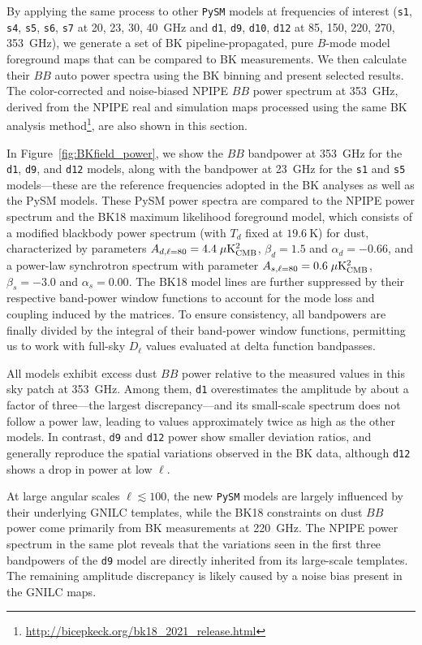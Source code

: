 \documentclass[twocolumn]{aastex631}
\begin{document}
By applying the same process to other \texttt{PySM} models at frequencies of interest (\texttt{s1}, \texttt{s4}, \texttt{s5}, \texttt{s6}, \texttt{s7} at 20, 23, 30, 40~GHz and \texttt{d1}, \texttt{d9}, \texttt{d10}, \texttt{d12} at 85, 150, 220, 270, 353~GHz), we generate a set of BK pipeline-propagated, pure $B$-mode model foreground maps that can be compared to BK measurements. We then calculate their $BB$ auto power spectra using the BK binning and present selected results. The color-corrected and noise-biased NPIPE $BB$ power spectrum at 353~GHz, derived from the NPIPE real and simulation maps processed using the same BK analysis method\footnote{\url{http://bicepkeck.org/bk18_2021_release.html}}, are also shown in this section. 

In Figure~\ref{fig:BKfield_power}, we show the $BB$ bandpower at 353~GHz for the \texttt{d1}, \texttt{d9}, and \texttt{d12} models, along with the bandpower at 23~GHz for the \texttt{s1} and \texttt{s5} models---these are the reference frequencies adopted in the BK analyses as well as the PySM models. These PySM power spectra are compared to the NPIPE power spectrum and the BK18 maximum likelihood foreground model, which consists of a modified blackbody power spectrum (with $T_d$ fixed at $19.6~\text{K}$) for dust, characterized by parameters $A_{d,\ell=80} = 4.4 \; \mu\rm{K^2_{CMB}}$, $\beta_d = 1.5$ and $\alpha_d = -0.66$, and a power-law synchrotron spectrum with parameter $A_{s,\ell=80} = 0.6 \; \mu\rm{K^2_{CMB}}$, $\beta_s = -3.0$ and $\alpha_s = 0.00$. The BK18 model lines are further suppressed by their respective band-power window functions to account for the mode loss and coupling induced by the matrices. To ensure consistency, all bandpowers are finally divided by the integral of their band-power window functions, permitting us to work with full-sky $D_\ell$ values evaluated at delta function bandpasses.

All models exhibit excess dust $BB$ power relative to the measured values in this sky patch at 353~GHz. Among them, \texttt{d1} overestimates the amplitude by about a factor of three---the largest discrepancy---and its small-scale spectrum does not follow a power law, leading to values approximately twice as high as the other models. In contrast, \texttt{d9} and \texttt{d12} power show smaller deviation ratios, and generally reproduce the spatial variations observed in the BK data, although \texttt{d12} shows a drop in power at low $\ell$.

At large angular scales $\ell \lesssim 100$, the new \texttt{PySM} models are largely influenced by their underlying GNILC templates, while the BK18 constraints on dust $BB$ power come primarily from BK measurements at 220~GHz. The NPIPE power spectrum in the same plot reveals that the variations seen in the first three bandpowers of the \texttt{d9} model are directly inherited from its large-scale templates. The remaining amplitude discrepancy is likely caused by a noise bias present in the GNILC maps.
\end{document}
